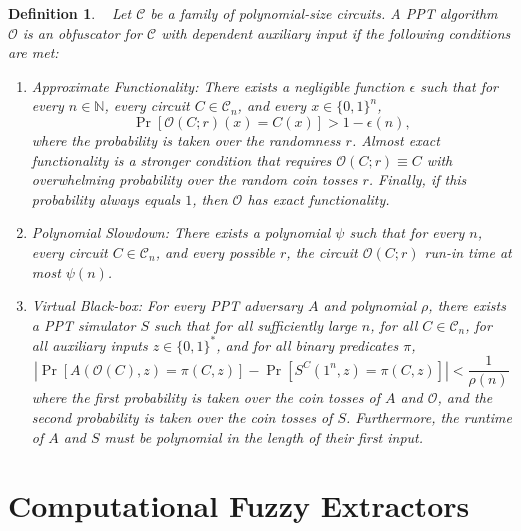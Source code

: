 \documentclass[11pt]{article}
\newcommand{\zo}{\ensuremath{\{0, 1\}}}
\newtheorem{definition}[theorem]{Definition}
\begin{document}
\begin{definition}~\cite{barak2001possibility, goldwasser2005impossibility}  
\label{def:obf} Let $\mathcal{C}$ be a family of polynomial-size circuits.  A PPT algorithm $\mathcal{O}$ is an obfuscator for $\mathcal{C}$ with dependent auxiliary input if the following conditions are met:
\begin{enumerate}
\item \emph{Approximate Functionality:}  There exists a negligible function $\epsilon$ such that for every $n\in \mathbb{N}$, every circuit $C\in \mathcal{C}_n$, and every $x\in\zo^n$, 
\[
\Pr[\mathcal{O}(C; r)(x) = C(x)] > 1-\epsilon(n),
\]
where the probability is taken over the randomness $r$.  \emph{Almost exact functionality} is a stronger condition that requires $\mathcal{O}(C;r)\equiv C$ with overwhelming probability over the random coin tosses $r$.  Finally, if this probability always equals $1$, then $\mathcal{O}$ has \emph{exact functionality}.
\item \emph{Polynomial Slowdown:}  There exists a polynomial $\psi$ such that for every $n$, every circuit $C\in \mathcal{C}_n$, and every possible $r$, the circuit $\mathcal{O}(C; r)$ run-in time at most $\psi(n)$.
\item \emph{Virtual Black-box:}  For every PPT adversary $A$ and polynomial $\rho$, there exists a PPT simulator $S$ such that for all sufficiently large $n$, for all $C\in \mathcal{C}_n$, for all auxiliary inputs $z\in \zo^*$, 
and for all binary predicates $\pi$, 
\[
|\Pr[A(\mathcal{O}(C), z) = \pi(C, z)] - \Pr[S^C(1^n, z) = \pi(C, z)] | < \frac{1}{\rho(n)}
\]
where the first probability is taken over the coin tosses of $A$ and $\mathcal{O}$, and the second probability is taken over the coin tosses of $S$.  Furthermore, the runtime of $A$ and $S$ must be polynomial in the length of their first input.
\end{enumerate}
\end{definition}


\section{Computational Fuzzy Extractors}
\label{sec:fuzzy extractors}
\end{document}

